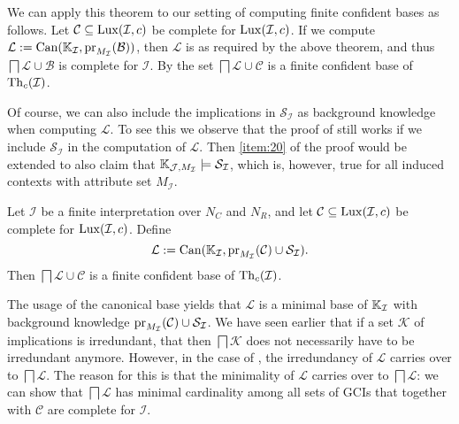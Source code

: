 We can apply this theorem to our setting of computing finite confident bases as follows.
Let $\mathcal{C} \subseteq \operatorname{Lux}(\mathcal{I}, c)$ be complete for $\operatorname{Lux}(\mathcal{I}, c)$.
If we compute $\mathcal{L} := \operatorname{Can}({\mathbb{K}}_{\mathcal{I}},
\operatorname{pr}_{M_{\mathcal{I}}}(\mathcal{B}))$, then $\mathcal{L}$ is as required by the above
theorem, and thus $\bigsqcap \mathcal{L} \cup \mathcal{B}$ is complete for $\mathcal{I}$.
By  the set $\bigsqcap \mathcal{L} \cup
\mathcal{C}$ is a finite confident base of $\operatorname{Th}_c(\mathcal{I})$.

Of course, we can also include the implications in $\mathcal{S}_{\mathcal{I}}$ as
background knowledge when computing $\mathcal{L}$.  To see this we observe that the proof
of  still works if we include
$\mathcal{S}_{\mathcal{I}}$ in the computation of $\mathcal{L}$.  Then \cref{item:20} of
the proof would be extended to also claim that ${\mathbb{K}}_{\mathcal{J}, M_{\mathcal{I}}}
\models \mathcal{S}_{\mathcal{I}}$, which is, however, true for all induced contexts with
attribute set $M_{\mathcal{I}}$.

\begin{Corollary}
  \label{cor:gci-completion-with-S_I}
  Let $\mathcal{I}$ be a finite interpretation over $N_C$ and $N_R$, and let $\mathcal{C}
  \subseteq \operatorname{Lux}(\mathcal{I}, c)$ be complete for $\operatorname{Lux}(\mathcal{I}, c)$.  Define
  \begin{equation*}
    \mathcal{L} := \operatorname{Can}({\mathbb{K}}_{\mathcal{I}}, \operatorname{pr}_{M_{\mathcal{I}}}(\mathcal{C}) \cup \mathcal{S}_{\mathcal{I}}).
  \end{equation*}
  Then $\bigsqcap \mathcal{L} \cup \mathcal{C}$ is a finite confident base of
  $\operatorname{Th}_c(\mathcal{I})$.
\end{Corollary}

The usage of the canonical base yields that $\mathcal{L}$ is a minimal base of ${\mathbb{K}}_{\mathcal{I}}$ with background knowledge $\operatorname{pr}_{M_{\mathcal{I}}}(\mathcal{C}) \cup
\mathcal{S}_{\mathcal{I}}$.  We have seen earlier that if a set $\mathcal{K}$ of
implications is irredundant, that then $\bigsqcap \mathcal{K}$ does not necessarily have
to be irredundant anymore.  However, in the case of ,
the irredundancy of $\mathcal{L}$ carries over to $\bigsqcap \mathcal{L}$.  The reason for
this is that the minimality of $\mathcal{L}$ carries over to $\bigsqcap \mathcal{L}$: we
can show that $\bigsqcap \mathcal{L}$ has minimal cardinality among all sets of GCIs that
together with $\mathcal{C}$ are complete for $\mathcal{I}$.

